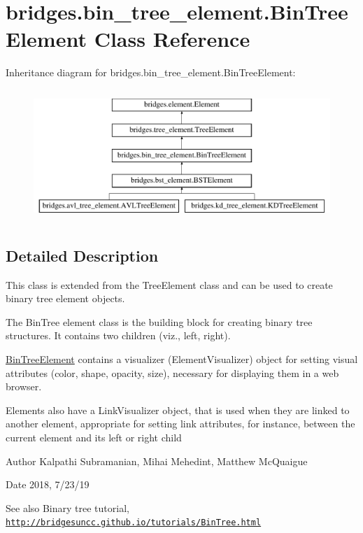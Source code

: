 \hypertarget{classbridges_1_1bin__tree__element_1_1_bin_tree_element}{}\section{bridges.\+bin\+\_\+tree\+\_\+element.\+Bin\+Tree\+Element Class Reference}
\label{classbridges_1_1bin__tree__element_1_1_bin_tree_element}
Inheritance diagram for bridges.\+bin\+\_\+tree\+\_\+element.\+Bin\+Tree\+Element\+:\begin{figure}[H]
\begin{center}
\leavevmode
\includegraphics[height=5.000000cm]{classbridges_1_1bin__tree__element_1_1_bin_tree_element}
\end{center}
\end{figure}


\subsection{Detailed Description}
This class is extended from the Tree\+Element class and can be used to create binary tree element objects. 

The Bin\+Tree element class is the building block for creating binary tree structures. It contains two children (viz., left, right).

\mbox{\hyperlink{classbridges_1_1bin__tree__element_1_1_bin_tree_element}{Bin\+Tree\+Element}} contains a visualizer (Element\+Visualizer) object for setting visual attributes (color, shape, opacity, size), necessary for displaying them in a web browser.

Elements also have a Link\+Visualizer object, that is used when they are linked to another element, appropriate for setting link attributes, for instance, between the current element and its left or right child

\begin{DoxyAuthor}{Author}
Kalpathi Subramanian, Mihai Mehedint, Matthew Mc\+Quaigue
\end{DoxyAuthor}
\begin{DoxyDate}{Date}
2018, 7/23/19
\end{DoxyDate}
\begin{DoxySeeAlso}{See also}
Binary tree tutorial, \href{http://bridgesuncc.github.io/tutorials/BinTree.html}{\tt http\+://bridgesuncc.\+github.\+io/tutorials/\+Bin\+Tree.\+html} 
\end{DoxySeeAlso}
